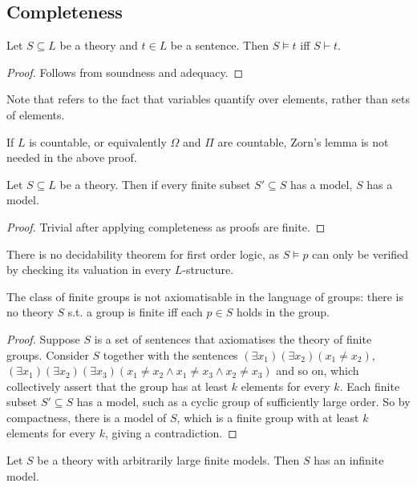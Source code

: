 \subsection{Completeness}
\begin{theorem}
    Let $S \subseteq L$ be a theory and $t \in L$ be a sentence.
    Then $S \models t$ iff $S \vdash t$.
\end{theorem}
\begin{proof}
    Follows from soundness and adequacy.
\end{proof}
Note that  refers to the fact that variables quantify over elements, rather than sets of elements.
\begin{remark}
    If $L$ is countable, or equivalently $\Omega$ and $\Pi$ are countable, Zorn's lemma is not needed in the above proof.
\end{remark}
\begin{theorem}
    Let $S \subseteq L$ be a theory.
    Then if every finite subset $S' \subseteq S$ has a model, $S$ has a model.
\end{theorem}
\begin{proof}
    Trivial after applying completeness as proofs are finite.
\end{proof}
There is no decidability theorem for first order logic, as $S \models p$ can only be verified by checking its valuation in every $L$-structure.
\begin{corollary}
    The class of finite groups is not axiomatisable in the language of groups: there is no theory $S$ s.t. a group is finite iff each $p \in S$ holds in the group.
\end{corollary}
\begin{proof}
    Suppose $S$ is a set of sentences that axiomatises the theory of finite groups.
    Consider $S$ together with the sentences $(\exists x_1)(\exists x_2)(x_1 \neq x_2)$, $(\exists x_1)(\exists x_2)(\exists x_3)(x_1 \neq x_2 \wedge x_1 \neq x_3 \wedge x_2 \neq x_3)$ and so on, which collectively assert that the group has at least $k$ elements for every $k$.
    Each finite subset $S' \subseteq S$ has a model, such as a cyclic group of sufficiently large order.
    So by compactness, there is a model of $S$, which is a finite group with at least $k$ elements for every $k$, giving a contradiction.
\end{proof}
\begin{corollary}
    Let $S$ be a theory with arbitrarily large finite models.
    Then $S$ has an infinite model.
\end{corollary}
